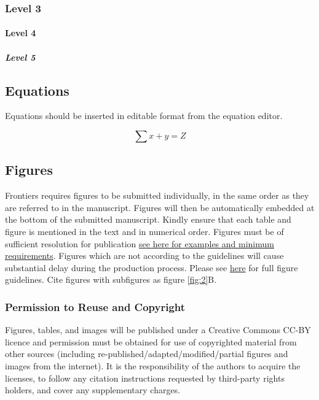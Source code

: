 \documentclass[utf8]{frontiersSCNS} %
\begin{document}
\subsubsection{Level 3}
\paragraph{Level 4}
\subparagraph{Level 5}

\subsection{Equations}
Equations should be inserted in editable format from the equation editor.

\begin{equation}
\sum x+ y =Z\label{eq:01}
\end{equation}

\subsection{Figures}
Frontiers requires figures to be submitted individually, in the same order as they are referred to in the manuscript. Figures will then be automatically embedded at the bottom of the submitted manuscript. Kindly ensure that each table and figure is mentioned in the text and in numerical order. Figures must be of sufficient resolution for publication \href{http://home.frontiersin.org/about/author-guidelines#ResolutionRequirements}{see here for examples and minimum requirements}. Figures which are not according to the guidelines will cause substantial delay during the production process. Please see \href{http://home.frontiersin.org/about/author-guidelines#GeneralStyleGuidelinesforFigures}{here} for full figure guidelines. Cite figures with subfigures as figure \ref{fig:2}B.


\subsubsection{Permission to Reuse and Copyright}
Figures, tables, and images will be published under a Creative Commons CC-BY licence and permission must be obtained for use of copyrighted material from other sources (including re-published/adapted/modified/partial figures and images from the internet). It is the responsibility of the authors to acquire the licenses, to follow any citation instructions requested by third-party rights holders, and cover any supplementary charges.
\end{document}
